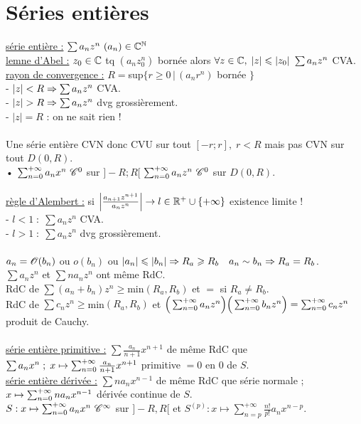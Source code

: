 \documentclass[12 pt]{exampleclass}
\begin{document}
\section{Séries entières}
\underline{série entière :} $\sum a_n z^n \ (a_n)\in\C^\N$\\
\underline{lemne d'Abel :} $z_0\in\mathbb{C}$ tq $(a_n z_0^n)$ bornée alors $\forall z\in\mathbb{C}, \; |z|\leqslant|z_0| \ \sum a_n z^n$ CVA.\\
\underline{rayon de convergence :} $R = $sup$ \{r\geqslant0 \, |\, (a_n r^n)$ bornée $\}$\\
- $|z|<R \Rightarrow \sum a_n z^n$ CVA.\\
- $|z|>R \Ra \sum a_n z^n$ dvg grossièrement.\\
- $|z| = R$ : on ne sait rien !\\
\text{}\\
Une série entière CVN donc CVU sur tout $[-r;r],\; r<R$ mais pas CVN sur tout $D(0,R)$.\\
• $\sum_{n=0}^{+\infty} a_n x^n \ \mathscr{C}^0$ sur $]-R;R[$ \qquad $\sum_{n=0}^{+\infty} a_n z^n \ \mathscr{C}^0$ sur $D(0,R)$.\\
\text{}\\
\underline{règle d'Alembert :} si $\Big|\frac{a_{n+1} z^{n+1}}{a_n z^n} \Big| \to l\in \mathbb{R}^+ \cup \{+\infty\}$ \quad  existence limite !\\
- $l<1 \; : \; \sum a_n z^n$ CVA.\\
- $l>1 \; : \; \sum a_n z^n$ dvg grossièrement.\\
\text{}\\
$a_n = \mathscr{O}(b_n)$ ou $o(b_n)$ ou $|a_n|\leqslant |b_n| \Rightarrow R_a\geqslant R_b \quad a_n\sim b_n \Rightarrow R_a = R_b$.\\
$\sum a_n z^n$ et $\sum n a_n z^n$ ont même RdC.\\
RdC de $\sum (a_n + b_n)z^n \geqslant $min$(R_a,R_b)$ et $=$ si $R_a\neq R_b$.\\
RdC de $\sum c_n z^n \geqslant $min$(R_a,R_b)$ et $\Big(\sum_{n=0}^{+\infty} a_n z^n\Big)\Big(\sum_{n=0}^{+\infty} b_n z^n\Big) = \sum_{n=0}^{+\infty} c_n z^n$ produit de Cauchy.\\
\text{}\\
\underline{série entière primitive :} $\sum \frac{a_n}{n+1} x^{n+1}$ de même RdC que $\sum a_n x^n \; ; \; x\mapsto \sum_{n=0}^{+\infty} \frac{a_n}{n+1} x^{n+1}$ primitive $=0$ en $0$ de $S$.\\
\underline{série entière dérivée :} $\sum n a_n x^{n-1}$ de même RdC que série normale ; $x\mapsto \sum_{n=0}^{+\infty} n a_n x^{n-1}$ dérivée continue de $S$.\\
$S : x\mapsto \sum_{n=0}^{+\infty} a_n x^n \ \mathscr{C}^\infty$ sur $]-R,R[$ et $S^{(p)} : x\mapsto \sum_{n=p}^{+\infty} \frac{n!}{p!} a_n x^{n-p}$.\\
\end{document}
